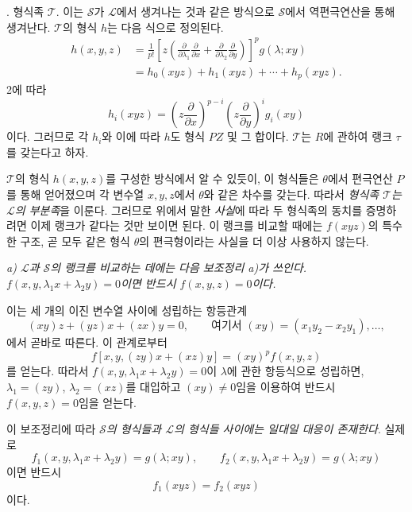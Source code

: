 . 형식족 $\mathcal T$. 이는 $\mathcal S$가 $\mathcal L$에서 생겨나는 것과 같은 방식으로 $\mathcal S$에서 역편극연산을 통해 생겨난다. $\mathcal T$의 형식 $h$는 다음 식으로 정의된다.
\[
\begin{aligned}
 h(x,y,z)
 &=\frac1{p!}\left[z\left(\frac{\partial}{\partial\lambda_1}\frac{\partial}{\partial x}
 +\frac{\partial}{\partial\lambda_2}\frac{\partial}{\partial y}\right)\right]^p g(\lambda;xy)\\
 &=h_0(xyz)+h_1(xyz)+\cdots+h_p(xyz).
\end{aligned}
\]
2에 따라
\[
  h_i(xyz)=
  \left(z\frac{\partial}{\partial x}\right)^{p-i}
  \left(z\frac{\partial}{\partial y}\right)^i g_i(xy)
\]
이다. 그러므로 각 $h_i$와 이에 따라 $h$도 형식 $PZ$ 및 그 합이다. $\mathcal T$는 $R$에 관하여 랭크 $\tau$를 갖는다고 하자.

$\mathcal T$의 형식 $h(x,y,z)$를 구성한 방식에서 알 수 있듯이, 이 형식들은 $\theta$에서 편극연산 $P$를 통해 얻어졌으며 각 변수열 $x,y,z$에서 $\theta$와 같은 차수를 갖는다. 따라서 \emph{형식족 $\mathcal T$는 $\mathcal L$의 부분족}을 이룬다. 그러므로 위에서 말한 \emph{사실}에 따라 두 형식족의 동치를 증명하려면 이제 랭크가 같다는 것만 보이면 된다. 이 랭크를 비교할 때에는 $f(xyz)$의 특수한 구조, 곧 모두 같은 형식 $\theta$의 편극형이라는 사실을 더 이상 사용하지 않는다.

\emph{a) $\mathcal L$과 $\mathcal S$의 랭크를 비교하는 데에는 다음 보조정리 a)가 쓰인다. $f(x,y,\lambda_1x+\lambda_2y)=0$이면 반드시 $f(x,y,z)=0$이다.}

이는 세 개의 이진 변수열 사이에 성립하는 항등관계
\[
  (xy)z+(yz)x+(zx)y=0,
  \qquad \text{여기서 }(xy)=(x_1y_2-x_2y_1),\ldots,
\]
에서 곧바로 따른다. 이 관계로부터
\[
  f[x,y,(zy)x+(xz)y]=(xy)^p f(x,y,z)
\]
를 얻는다. 따라서 $f(x,y,\lambda_1x+\lambda_2y)=0$이 $\lambda$에 관한 항등식으로 성립하면, $\lambda_1=(zy)$, $\lambda_2=(xz)$를 대입하고 $(xy)\ne0$임을 이용하여 반드시 $f(x,y,z)=0$임을 얻는다.

이 보조정리에 따라 \emph{$\mathcal S$의 형식들과 $\mathcal L$의 형식들 사이에는 일대일 대응이 존재한다}. 실제로
\[
  f_1(x,y,\lambda_1x+\lambda_2y)=g(\lambda;xy),\qquad
  f_2(x,y,\lambda_1x+\lambda_2y)=g(\lambda;xy)
\]
이면 반드시
\[
  f_1(xyz)=f_2(xyz)
\]
이다.

